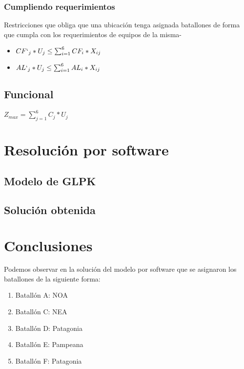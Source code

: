 \documentclass[12pt]{article}
\begin{document}
\subsubsection{Cumpliendo requerimientos}

Restricciones que obliga que una ubicación tenga asignada batallones de forma que cumpla con los requerimientos de equipos de la misma-

\begin{itemize}
    \item $ CF`_{j} * U_{j} \leq \sum_{i=1}^{6} CF_{i} * X_{ij}$
    \item $ AL`_{j} * U_{j} \leq \sum_{i=1}^{6} AL_{i} * X_{ij}$
\end{itemize}

\subsection{Funcional}

$Z_{max} = \sum_{j=1}^{6} C_{j} * U_{j}$

\section{Resolución por software}

\subsection{Modelo de GLPK}



\subsection{Solución obtenida}



\section{Conclusiones}

Podemos observar en la solución del modelo por software que se asignaron los batallones de la siguiente forma:

\begin{enumerate}
	\item Batallón A: NOA
	\item Batallón C: NEA
	\item Batallón D: Patagonia
	\item Batallón E: Pampeana
	\item Batallón F: Patagonia
\end{enumerate}
\end{document}
